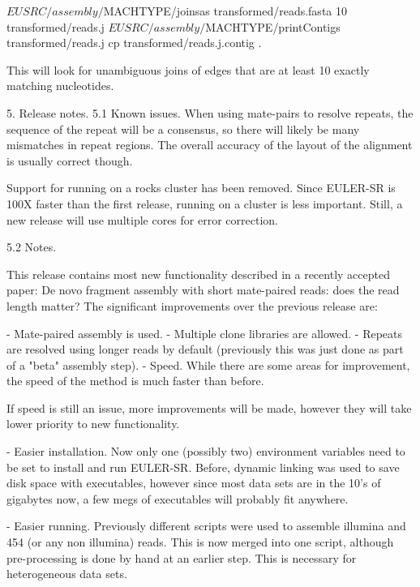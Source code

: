 \documentclass{article}[12pt]
\begin{document}
		${EUSRC}/assembly/${MACHTYPE}/joinsas transformed/reads.fasta 10 transformed/reads.j
		${EUSRC}/assembly/${MACHTYPE}/printContigs transformed/reads.j
		cp transformed/reads.j.contig .


		This will look for unambiguous joins of edges that are at least 10
		exactly matching nucleotides.


5. Release notes.
  5.1 Known issues.
	   When using mate-pairs to resolve repeats, the sequence of the
  repeat will be a consensus, so there will likely be many mismatches
  in repeat regions.  The overall accuracy of the layout of the
  alignment is usually correct though.

	Support for running on a rocks cluster has been removed.  Since
	EULER-SR is 100X faster than the first release, running on a cluster
	is less important.  Still, a new release will use multiple cores for
	error correction.


  5.2 Notes.

	This release contains most new functionality described in a recently
	accepted paper: De novo fragment assembly with short mate-paired
	reads: does the read length matter?  The significant improvements
	over the previous release are:

  - Mate-paired assembly is used.
     - Multiple clone libraries are allowed.
  - Repeats are resolved using longer reads by default (previously
     this was just done as part of a "beta" assembly step).
  - Speed.  While there are some areas for improvement, the speed of
     the method is much faster than before.

		 If speed is still an issue, more improvements will be made,
		 however they will take lower priority to new functionality.

  - Easier installation.  Now only one (possibly two) environment
    variables need to be set to install and run EULER-SR.  Before,
    dynamic linking was used to save disk space with executables,
    however since most data sets are in the 10's of gigabytes now, a
    few megs of executables will probably fit anywhere.

  - Easier running. Previously different scripts were used to assemble
    illumina and 454 (or any non illumina) reads.  This is now merged
    into one script, although pre-processing is done by hand at an
    earlier step.  This is necessary for heterogeneous data sets.


	
\end{document}
